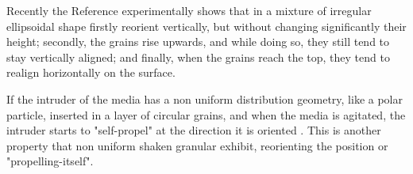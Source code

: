     Recently the Reference \cite{Size_segregation_of_irregular_granular_materials_captured_by_time-resolved_3D_imaging} experimentally shows that in a mixture of irregular ellipsoidal shape firstly reorient vertically, but without changing significantly their height; secondly, the grains rise upwards, and while doing so, they still tend to stay vertically aligned; and finally, when the grains reach the top, they tend to realign horizontally on the surface.

    If the intruder of the media has a non uniform distribution geometry, like a polar particle, inserted in a layer of circular grains, and when the media is agitated, the intruder starts to "self-propel" at the direction it is oriented \cite{Symmetry_properties_of_the_large-deviation_function_of_the_velocity_of_a_self-propelled_polar_particle}. This is another property that non uniform shaken granular exhibit, reorienting the position or "propelling-itself".


